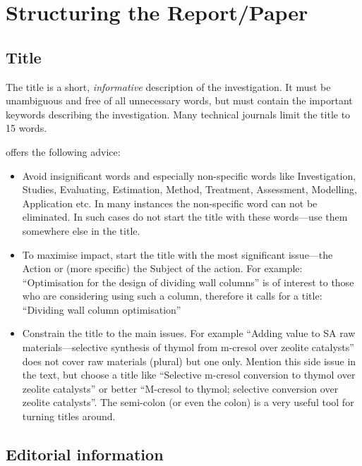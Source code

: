 \documentclass[a5paper, 10pt]{article}
\begin{document}
\section{Structuring the Report/Paper}
\label{cha:structure}

\subsection{Title}
\label{sec:title}
The title is a short, \emph{informative} description of the
investigation.  It must be unambiguous and free of all unnecessary
words, but must contain the important keywords describing the
investigation. Many technical journals limit the title to 15 words.

\citet{mandersloot} offers the following advice:
\begin{itemize}
\item Avoid insignificant words and especially non-specific words like
  Investigation, Studies, Evaluating, Estimation, Method, Treatment,
  Assessment, Modelling, Application etc. In many instances the
  non-specific word can not be eliminated. In such cases do not start
  the title with these words---use them somewhere else in the title.

\item To maximise impact, start the title with the most significant
  issue---the Action or (more specific) the Subject of the action.
  For example: ``Optimisation for the design of dividing wall columns''
  is of interest to those who are considering using such a column,
  therefore it calls for a title: ``Dividing wall column optimisation''

\item Constrain the title to the main issues. For example ``Adding
  value to SA raw materials---selective synthesis of thymol from
  m-cresol over zeolite catalysts'' does not cover raw materials
  (plural) but one only. Mention this side issue in the text, but
  choose a title like ``Selective m-cresol conversion to thymol over
  zeolite catalysts'' or better ``M-cresol to thymol; selective
  conversion over zeolite catalysts''.  The semi-colon (or even the
  colon) is a very useful tool for turning titles around.
\end{itemize}

\subsection{Editorial information}
\end{document}
